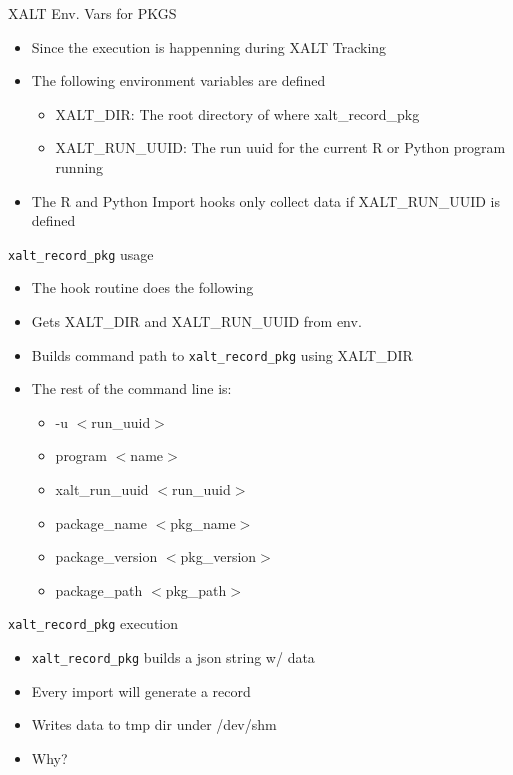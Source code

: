 \documentclass{beamer}
\begin{document}
\begin{frame}{XALT Env. Vars for PKGS}
  \begin{itemize}
    \item Since the execution is happenning during XALT Tracking
    \item The following environment variables are defined
      \begin{itemize}
        \item XALT\_DIR: The root directory of where xalt\_record\_pkg
        \item XALT\_RUN\_UUID: The run uuid for the current R or
          Python program running
      \end{itemize}
    \item The R and Python Import hooks only collect data if
      XALT\_RUN\_UUID is defined
  \end{itemize}
\end{frame}

\begin{frame}{\texttt{xalt\_record\_pkg} usage}
  \begin{itemize}
    \item The hook routine does the following
    \item Gets XALT\_DIR and XALT\_RUN\_UUID from env.
    \item Builds command path to \texttt{xalt\_record\_pkg} using
      XALT\_DIR
    \item The rest of the command line is:
      \begin{itemize}
        \item -u $<$run\_uuid$>$
        \item program $<$name$>$
        \item xalt_run_uuid $<$run\_uuid$>$
        \item package\_name $<$pkg_name$>$
        \item package\_version $<$pkg_version$>$
        \item package\_path $<$pkg_path$>$
      \end{itemize}
  \end{itemize}
\end{frame}

\begin{frame}{\texttt{xalt\_record\_pkg} execution}
  \begin{itemize}
    \item \texttt{xalt\_record\_pkg} builds a json string w/ data
    \item Every import will generate a record
    \item Writes data to tmp dir under /dev/shm
    \item Why?
  \end{itemize}
\end{frame}
\end{document}

